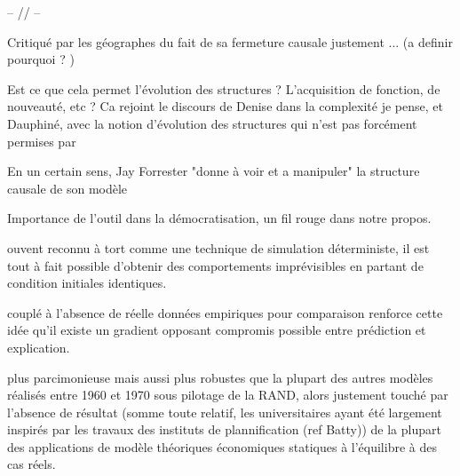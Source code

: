 

-- // --





Critiqué par les géographes du fait de sa fermeture causale justement ... (a definir pourquoi ? )

Est ce que cela permet l'évolution des structures ? L'acquisition de fonction, de nouveauté, etc ? 
Ca rejoint le discours de Denise dans la complexité je pense, et Dauphiné, avec la notion d'évolution des structures qui n'est pas forcément permises par 


En un certain sens, Jay Forrester "donne à voir et a manipuler" la structure causale de son modèle

Importance de l'outil dans la démocratisation, un fil rouge dans notre propos.

 ouvent reconnu à tort comme une technique de simulation déterministe, il est tout à fait possible d'obtenir des comportements imprévisibles en partant de condition initiales identiques.

  couplé à l'absence de réelle données empiriques pour comparaison renforce cette idée qu'il existe un gradient opposant  compromis possible entre prédiction et explication.

 plus parcimonieuse mais aussi plus robustes que la plupart des autres modèles réalisés entre 1960 et 1970 sous pilotage de la RAND, alors justement touché par l'absence de résultat (somme toute relatif, les universitaires ayant été largement inspirés par les travaux des instituts de plannification  (ref Batty)) de la plupart des applications de modèle théoriques économiques statiques à l'équilibre à des cas réels. 

